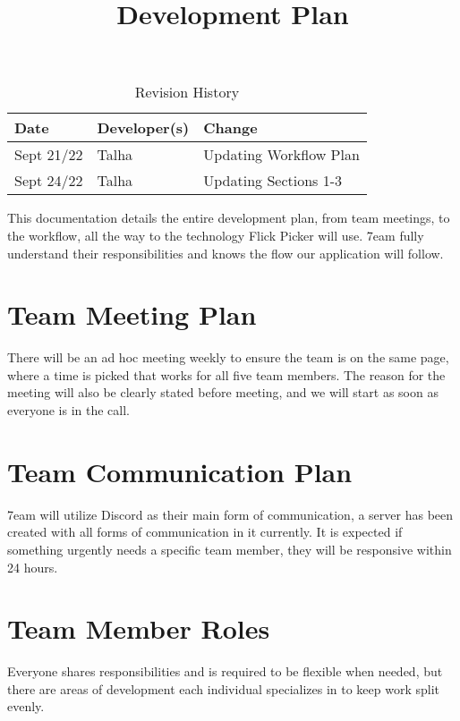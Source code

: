 \documentclass{article}
\title{Development Plan\\\progname}
\author{\authname}
\date{}
\begin{document}
\maketitle

\newpage

\begin{table}[hp]
\caption{Revision History} \label{TblRevisionHistory}
\begin{tabularx}{\textwidth}{llX}
\toprule
\textbf{Date} & \textbf{Developer(s)} & \textbf{Change}\\
\midrule
Sept 21/22 & Talha & Updating Workflow Plan\\
Sept 24/22 & Talha & Updating Sections 1-3\\
\bottomrule
\end{tabularx}
\end{table}

\newpage

\tableofcontents

\newpage

This documentation details the entire development plan, from team meetings, to the workflow, all the way to the technology Flick Picker will use. 7eam fully understand their responsibilities and knows the flow our application will follow. 

\section{Team Meeting Plan}
There will be an ad hoc meeting weekly to ensure the team is on the same page, where a time is picked that works for all five team members. The reason for the meeting will also be clearly stated before meeting, and we will start as soon as everyone is in the call.

\section{Team Communication Plan}
7eam will utilize Discord as their main form of communication, a server has been created with all forms of communication in it currently. It is expected if something urgently needs a specific team member, they will be responsive within 24 hours.

\section{Team Member Roles}
Everyone shares responsibilities and is required to be flexible when needed, but there are areas of development each individual specializes in to keep work split evenly.
\end{document}
